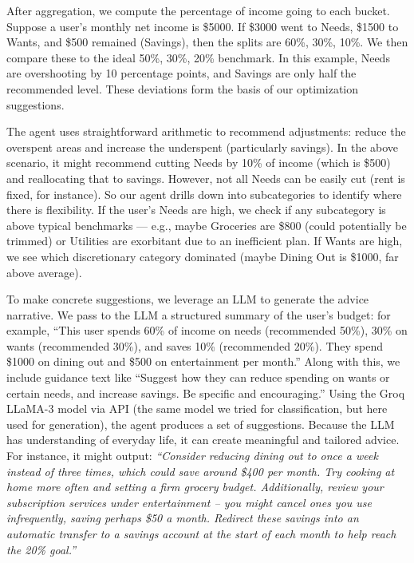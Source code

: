 \documentclass{scrartcl}
\begin{document}
After aggregation, we compute the percentage of income going to each bucket. Suppose a user’s monthly net income is \$5000. If \$$3000$ went to Needs, \$1500 to Wants, and \$500 remained (Savings), then the splits are 60\%, 30\%, 10\%. We then compare these to the ideal 50\%, 30\%, 20\% benchmark. In this example, Needs are overshooting by 10 percentage points, and Savings are only half the recommended level. These deviations form the basis of our optimization suggestions.

The agent uses straightforward arithmetic to recommend adjustments: reduce the overspent areas and increase the underspent (particularly savings). In the above scenario, it might recommend cutting Needs by 10\% of income (which is \$500) and reallocating that to savings. However, not all Needs can be easily cut (rent is fixed, for instance). So our agent drills down into subcategories to identify where there is flexibility. If the user’s Needs are high, we check if any subcategory is above typical benchmarks — e.g., maybe Groceries are \$800 (could potentially be trimmed) or Utilities are exorbitant due to an inefficient plan. If Wants are high, we see which discretionary category dominated (maybe Dining Out is \$1000, far above average). 

To make concrete suggestions, we leverage an LLM to generate the advice narrative. We pass to the LLM a structured summary of the user’s budget: for example, “This user spends 60\% of income on needs (recommended 50\%), 30\% on wants (recommended 30\%), and saves 10\% (recommended 20\%). They spend \$1000 on dining out and \$500 on entertainment per month.” Along with this, we include guidance text like “Suggest how they can reduce spending on wants or certain needs, and increase savings. Be specific and encouraging.” Using the Groq LLaMA-3 model via API (the same model we tried for classification, but here used for generation), the agent produces a set of suggestions. Because the LLM has understanding of everyday life, it can create meaningful and tailored advice. For instance, it might output: \textit{“Consider reducing dining out to once a week instead of three times, which could save around \$400 per month. Try cooking at home more often and setting a firm grocery budget. Additionally, review your subscription services under entertainment – you might cancel ones you use infrequently, saving perhaps \$50 a month. Redirect these savings into an automatic transfer to a savings account at the start of each month to help reach the 20\% goal.”} 
\end{document}
